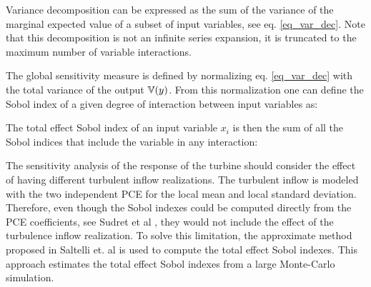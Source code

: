 \documentclass[preprint,12pt]{elsarticle}
\begin{document}
Variance decomposition can be expressed as the sum of the variance of the marginal expected value of a subset of input variables, see eq. \ref{eq_var_dec}. Note that this decomposition is not an infinite series expansion, it is truncated to the maximum number of variable interactions.


The global sensitivity measure is defined by normalizing eq. \ref{eq_var_dec} with the total variance of the output $\mathbb{V}(y)$. From this normalization one can define the Sobol index of a given degree of interaction between input variables as:


The total effect Sobol index of an input variable $x_i$ is then the sum of all the Sobol indices that include the variable in any interaction:


The sensitivity analysis of the response of the turbine should consider the effect of having different turbulent inflow realizations. The turbulent inflow is modeled with the two independent PCE for the local mean and local standard deviation. Therefore, even though the Sobol indexes could be computed directly from the PCE coefficients, see Sudret et al \cite{sudret2008global}, they would not include the effect of the turbulence inflow realization. To solve this limitation, the approximate method proposed in Saltelli et. al \cite{saltelli2010variance} is used to compute the total effect Sobol indexes. This approach estimates the total effect Sobol indexes from a large Monte-Carlo simulation.
\end{document}
